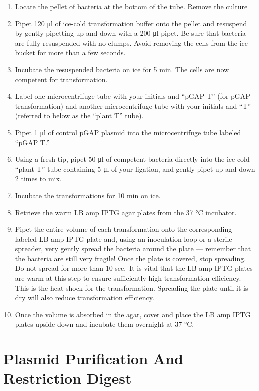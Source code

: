 \documentclass[]{book}
\providecommand{\tightlist}{%
  \setlength{\itemsep}{0pt}\setlength{\parskip}{0pt}}
\theoremstyle{definition}
\theoremstyle{definition}
\theoremstyle{definition}
\theoremstyle{remark}
\begin{document}
\begin{enumerate}
\def\labelenumi{\arabic{enumi}.}
\setcounter{enumi}{7}
\tightlist
\item
  Locate the pellet of bacteria at the bottom of the tube. Remove the
  culture
\item
  Pipet 120 μl of ice-cold transformation buffer onto the pellet and
  resuspend by gently pipetting up and down with a 200 μl pipet. Be sure
  that bacteria are fully resuspended with no clumps. Avoid removing the
  cells from the ice bucket for more than a few seconds.
\item
  Incubate the resuspended bacteria on ice for 5 min. The cells are now
  competent for transformation.
\item
  Label one microcentrifuge tube with your initials and ``pGAP T'' (for
  pGAP transformation) and another microcentrifuge tube with your
  initials and ``T'' (referred to below as the ``plant T'' tube).
\item
  Pipet 1 μl of control pGAP plasmid into the microcentrifuge tube
  labeled ``pGAP T.''
\item
  Using a fresh tip, pipet 50 μl of competent bacteria directly into the
  ice-cold ``plant T'' tube containing 5 μl of your ligation, and gently
  pipet up and down 2 times to mix.
\item
  Incubate the transformations for 10 min on ice.
\item
  Retrieve the warm LB amp IPTG agar plates from the 37 °C incubator.
\item
  Pipet the entire volume of each transformation onto the corresponding
  labeled LB amp IPTG plate and, using an inoculation loop or a sterile
  spreader, very gently spread the bacteria around the plate ---
  remember that the bacteria are still very fragile! Once the plate is
  covered, stop spreading. Do not spread for more than 10 sec.~It is
  vital that the LB amp IPTG plates are warm at this step to ensure
  sufficiently high transformation efficiency. This is the heat shock
  for the transformation. Spreading the plate until it is dry will also
  reduce transformation efficiency.
\item
  Once the volume is absorbed in the agar, cover and place the LB amp
  IPTG plates upside down and incubate them overnight at 37 °C.
\end{enumerate}

\chapter{Plasmid Purification And Restriction
Digest}\label{plasmid-purification-and-restriction-digest}
\end{document}
